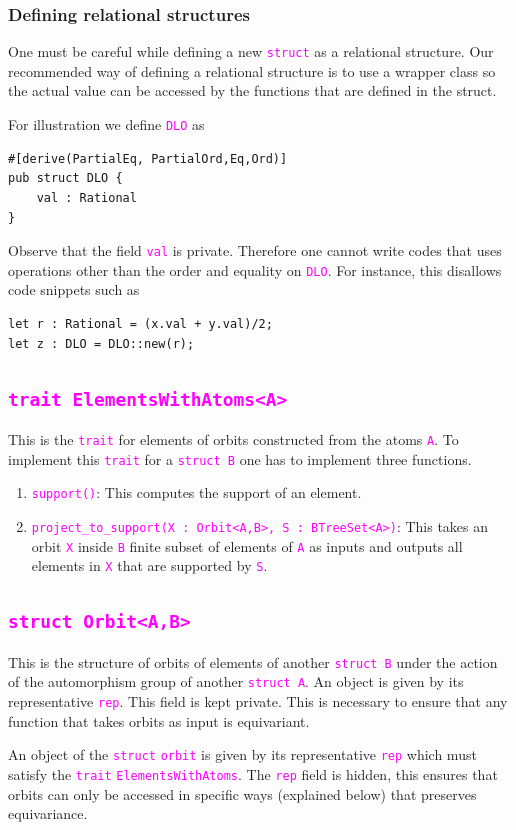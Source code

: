 \documentclass[12pt,a4paper,article]{memoir}
\newcommand{\arka}[1]{}
\newcommand{\code}[1]{\texttt{\textcolor{magenta}{#1}}}
\theoremstyle{definition}
\begin{document}
\subsubsection{Defining relational structures}
%
One must be careful while defining a new \code{struct} as a relational structure.
Our recommended way of defining a relational structure is to use a wrapper class so the actual value can be accessed by the functions that are defined in the struct.

For illustration we define \code{DLO} as
\color{magenta}
\begin{verbatim}
#[derive(PartialEq, PartialOrd,Eq,Ord)]
pub struct DLO {
    val : Rational
}
\end{verbatim}
\color{black}
%
Observe that the field \code{val} is private.
Therefore one cannot write codes that uses operations other than the order and equality on \code{DLO}.
For instance, this disallows code snippets such as
\color{magenta}
\begin{verbatim}
let r : Rational = (x.val + y.val)/2;
let z : DLO = DLO::new(r);
\end{verbatim}
\color{black}
%
\arka{one can still write a piece of code that runs on a while loop and computes an element greater than a given element}
%
\subsection{\code{trait ElementsWithAtoms<A>}}
%
This is the \code{trait} for elements of orbits constructed from the atoms \code{A}.
To implement this \code{trait} for a \code{struct B} one has to implement three functions.
\begin{enumerate}
\item \code{support()}: This computes the support of an element.
\item \code{project\_to\_support(X : Orbit<A,B>, S : BTreeSet<A>)}: This takes an orbit \code{X} inside \code{B} finite subset of elements of \code{A} as inputs and outputs all elements in \code{X} that are supported by \code{S}.
\end{enumerate}
%
\subsection{\code{struct Orbit<A,B>}}
%
This is the structure of orbits of elements of another \code{struct B} under the action of the automorphism group of another \code{struct A}.
An object is given by its representative \code{rep}.
This field is kept private.
This is necessary to ensure that any function that takes orbits as input is equivariant.
%
\arka{we have to add definition of equivariance and explain it}
%
An object of the \code{struct} \code{orbit} is given by its representative \code{rep} which must satisfy the \code{trait} \code{ElementsWithAtoms}.
The \code{rep} field is hidden,
this ensures that orbits can only be accessed in specific ways (explained below) that preserves equivariance.
\end{document}
